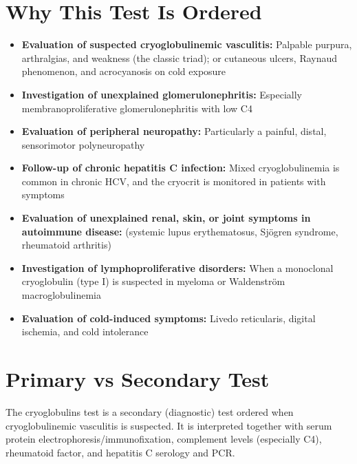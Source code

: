 \section*{Why This Test Is Ordered}
\begin{itemize}
  \item \textbf{Evaluation of suspected cryoglobulinemic vasculitis:} Palpable purpura, arthralgias, and weakness (the classic triad); or cutaneous ulcers, Raynaud phenomenon, and acrocyanosis on cold exposure
  \item \textbf{Investigation of unexplained glomerulonephritis:} Especially membranoproliferative glomerulonephritis with low C4
  \item \textbf{Evaluation of peripheral neuropathy:} Particularly a painful, distal, sensorimotor polyneuropathy
  \item \textbf{Follow-up of chronic hepatitis C infection:} Mixed cryoglobulinemia is common in chronic HCV, and the cryocrit is monitored in patients with symptoms
  \item \textbf{Evaluation of unexplained renal, skin, or joint symptoms in autoimmune disease:} (systemic lupus erythematosus, Sj\"ogren syndrome, rheumatoid arthritis)
  \item \textbf{Investigation of lymphoproliferative disorders:} When a monoclonal cryoglobulin (type I) is suspected in myeloma or Waldenstr\"om macroglobulinemia
  \item \textbf{Evaluation of cold-induced symptoms:} Livedo reticularis, digital ischemia, and cold intolerance
\end{itemize}

\section*{Primary vs Secondary Test}
The cryoglobulins test is a secondary (diagnostic) test ordered when cryoglobulinemic vasculitis is suspected. It is interpreted together with serum protein electrophoresis/immunofixation, complement levels (especially C4), rheumatoid factor, and hepatitis C serology and PCR.

